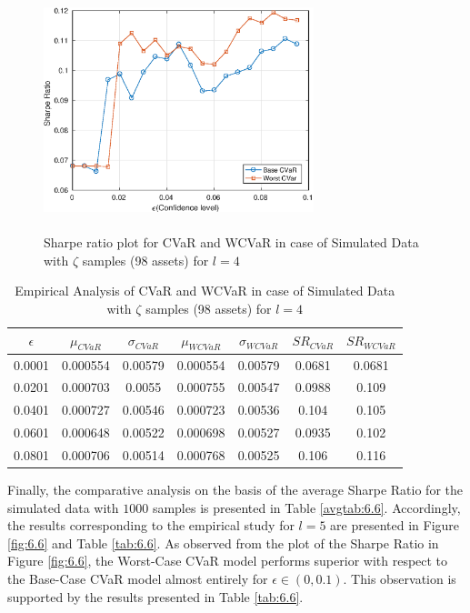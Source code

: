 \begin{figure}[!h]
    \centering
   
    \includegraphics[height=7.0cm,width=0.7\textwidth]{CVaR/bse100_simulated/sr_exact_4.eps}

   \caption{Sharpe ratio plot for CVaR and WCVaR in case of Simulated Data with $\zeta$ samples (98 assets) for $l=4$}
   \label{fig:6.5}
\end{figure}

\begin{table}[!h]
    \centering
    \captionsetup{justification=centering}

   \begin{tabular}{||c|c|c|c|c|c|c||}
   \hline
  
$\epsilon$ & $\mu_{CVaR}$ & $\sigma_{CVaR}$ & $\mu_{WCVaR}$ & $\sigma_{WCVaR}$ & $SR_{CVaR}$ & $SR_{WCVaR}$\\
  
  \hline
0.0001 & 0.000554 & 0.00579 & 0.000554 & 0.00579 & 0.0681 & 0.0681 \\
0.0201 & 0.000703 & 0.0055 & 0.000755 & 0.00547 & 0.0988 & 0.109 \\
0.0401 & 0.000727 & 0.00546 & 0.000723 & 0.00536 & 0.104 & 0.105 \\
0.0601 & 0.000648 & 0.00522 & 0.000698 & 0.00527 & 0.0935 & 0.102 \\
0.0801 & 0.000706 & 0.00514 & 0.000768 & 0.00525 & 0.106 & 0.116 \\
  \hline
\end{tabular}
    \caption{Empirical Analysis of CVaR and WCVaR in case of Simulated Data with $\zeta$ samples (98 assets) for $l=4$}
    \label{tab:6.5}
\end{table}

Finally, the comparative analysis on the basis of the average Sharpe Ratio for the simulated data with $1000$ samples is presented in Table \ref{avgtab:6.6}. Accordingly, the results corresponding to the empirical study for $l=5$ are presented in Figure \ref{fig:6.6} and Table \ref{tab:6.6}. As observed from the plot of the Sharpe Ratio in Figure \ref{fig:6.6}, the Worst-Case CVaR model performs superior with respect to the Base-Case CVaR model almost entirely for $\epsilon \in (0,0.1)$. This observation is supported by the results presented in Table \ref{tab:6.6}.

